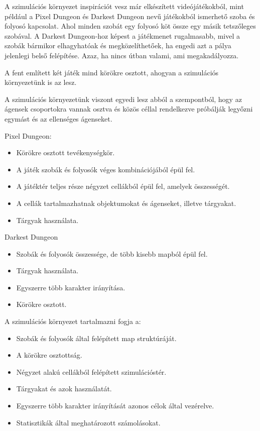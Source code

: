 

A szimulációs környezet inspirációt vesz már elkészített videójátékokból, mint például a Pixel Dungeon \cite{pixeldungeon} és Darkest Dungeon \cite{darkestdungeon} 
nevű játékokból ismerhető szoba és folyosó kapcsolat. Ahol minden szobát egy folyosó köt össze egy másik tetszőleges szobával.
A Darkest Dungeon-hoz képest a játékmenet rugalmasabb, mivel a szobák bármikor elhagyhatóak és megközelíthetőek, ha engedi azt a pálya jelenlegi belső felépítése.
Azaz, ha nincs útban valami, ami megakadályozza.

A fent említett két játék mind körökre osztott, ahogyan a szimulációs környezetünk is az lesz.

A szimulációs környezetünk viszont egyedi lesz abból a szempontból, hogy az ágensek csoportokra vannak osztva és közös céllal
rendelkezve próbálják legyőzni egymást és az ellenséges ágenseket.


\noindent Pixel Dungeon:


\begin{itemize}
    \item Körökre osztott tevékenységkör.
    \item A játék szobák és folyosók véges kombinációjából épül fel.
    \item A játéktér teljes része négyzet cellákból épül fel, amelyek összességét.
    \item A cellák tartalmazhatnak objektumokat és ágenseket, illetve tárgyakat.
    \item Tárgyak használata.
\end{itemize}

\noindent Darkest Dungeon

\begin{itemize}
    \item Szobák és folyosók összessége, de több kisebb mapból épül fel.
    \item Tárgyak használata.
    \item Egyszerre több karakter irányítása.
    \item Körökre osztott.
\end{itemize}

\noindent A szimulációs környezet tartalmazni fogja a:

\begin{itemize}
    \item Szobák és folyosók által felépített map struktúráját.
    \item A körökre osztottság.
    \item Négyzet alakú cellákból felépített szimulációstér.
    \item Tárgyakat és azok használatát.
    \item Egyszerre több karakter irányítását azonos célok által vezérelve.
    \item Statisztikák által meghatározott számolásokat.
\end{itemize}

